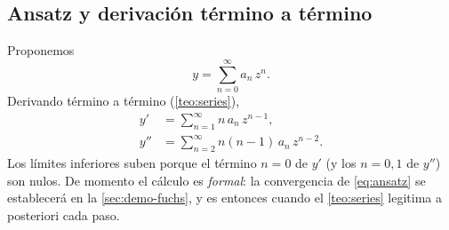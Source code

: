 \subsection{Ansatz y derivación término a término}\label{sec:ansatz}
Proponemos
\begin{equation}\label{eq:ansatz}
  y=\sum_{n=0}^{\infty}a_n\,z^{n}.
\end{equation}
Derivando término a término (\cref{teo:series}),
\begin{align}
  y'  &=\sum_{n=1}^{\infty}n\,a_n\,z^{n-1}, \label{eq:yp}\\
  y'' &=\sum_{n=2}^{\infty}n(n-1)\,a_n\,z^{n-2}. \label{eq:ypp}
\end{align}
Los límites inferiores suben porque el término $n=0$ de $y'$ (y los
$n=0,1$ de $y''$) son nulos. De momento el cálculo es \emph{formal}: la
convergencia de \eqref{eq:ansatz} se establecerá en la \cref{sec:demo-fuchs},
y es entonces cuando el \cref{teo:series} legitima a posteriori cada paso.

